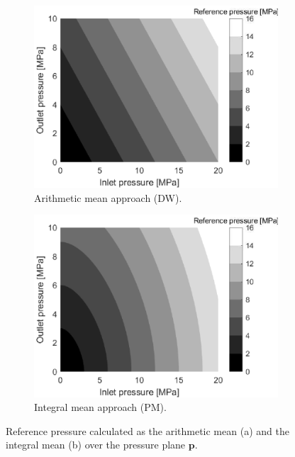 \begin{figure}
\begin{subfigure}[b]{0.48\textwidth}
        \includegraphics[width=\textwidth]{img/Figure1a.eps}
        \caption{Arithmetic mean approach (DW).}
        \label{fig:refpresdw2}
    \end{subfigure}
    \begin{subfigure}[b]{0.48\textwidth}
        \includegraphics[width=\textwidth]{img/Figure1b.eps}
        \caption{Integral mean approach (PM).}
        \label{fig:refprespm2}
    \end{subfigure}
    \caption{Reference pressure calculated as the arithmetic mean (a) and the integral mean (b) over the pressure plane $\mathbf{p}$.}\label{fig:refpres}
\end{figure}